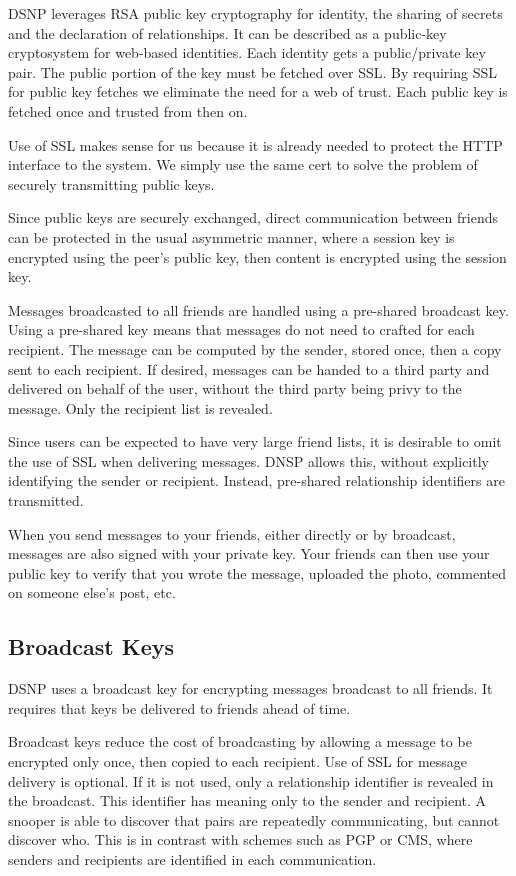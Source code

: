 \documentclass[letterpaper,11pt,oneside]{article}
\begin{document}
DSNP leverages RSA public key cryptography for identity, the sharing of secrets
and the declaration of relationships. It can be described as a public-key
cryptosystem for web-based identities. Each identity gets a public/private key
pair. The public portion of the key must be fetched over SSL. By requiring SSL
for public key fetches we eliminate the need for a web of trust. Each public
key is fetched once and trusted from then on.

Use of SSL makes sense for us because it is already needed to protect the HTTP
interface to the system. We simply use the same cert to solve the problem of
securely transmitting public keys.

Since public keys are securely exchanged, direct communication between friends
can be protected in the usual asymmetric manner, where a session key is
encrypted using the peer's public key, then content is encrypted using the
session key.

Messages broadcasted to all friends are handled using a pre-shared broadcast
key. Using a pre-shared key means that messages do not need to crafted for each
recipient. The message can be computed by the sender, stored once, then a copy
sent to each recipient. If desired, messages can be handed to a third party and
delivered on behalf of the user, without the third party being privy to the
message. Only the recipient list is revealed.

Since users can be expected to have very large friend lists, it is desirable to
omit the use of SSL when delivering messages. DNSP allows this, without
explicitly identifying the sender or recipient. Instead, pre-shared relationship
identifiers are transmitted.

When you send messages to your friends, either directly or by broadcast,
messages are also signed with your private key. Your friends can then use your
public key to verify that you wrote the message, uploaded the photo, commented
on someone else's post, etc.

\subsection{Broadcast Keys}

DSNP uses a broadcast key for encrypting messages broadcast to all friends.
It requires that keys be delivered to friends ahead of time.

Broadcast keys reduce the cost of broadcasting by allowing a message to be
encrypted only once, then copied to each recipient. Use of SSL for message
delivery is optional. If it is not used, only a relationship identifier is
revealed in the broadcast. This identifier has meaning only to the sender and
recipient. A snooper is able to discover that pairs are repeatedly
communicating, but cannot discover who. This is in contrast with schemes such
as PGP or CMS, where senders and recipients are identified in each
communication.
\end{document}
